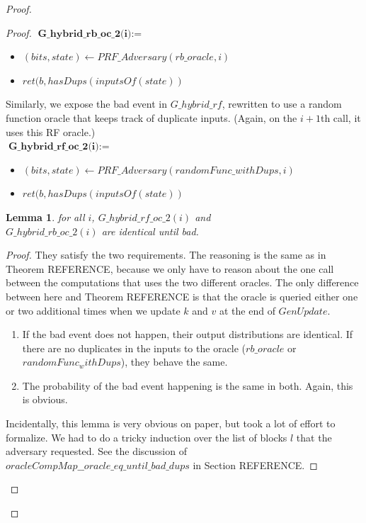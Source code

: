\documentclass[12pt,lot, lof]{puthesis}
\newenvironment{game}
{ \begin{itemize}[noitemsep,nolistsep] 
}
{ \end{itemize}                  }
\newcommand{\lar}{\leftarrow}
\newtheorem{lem}{Lemma}[thm]
\begin{document}
{\begin{proof}
\begin{proof}
$\textbf{G\_hybrid\_rb\_oc\_2(i)} := $
\begin{game}
\item[] $(bits, state) \lar PRF\_Adversary (rb\_oracle, i)$
\item[] $ret(b, hasDups(inputsOf(state))$ \\
\end{game}

Similarly, we expose the bad event in $G\_hybrid\_rf$, rewritten to use a random function oracle that keeps track of duplicate inputs. (Again, on the $i+1$th call, it uses this RF oracle.)\\

$\textbf{G\_hybrid\_rf\_oc\_2(i)} := $
\begin{game}
\item[] $(bits, state) \lar PRF\_Adversary (randomFunc\_withDups, i)$
\item[] $ret(b, hasDups(inputsOf(state))$ 
\end{game} 

\begin{lem} for all $i$,
$G\_hybrid\_rf\_oc\_2(i)$ and \\
  $G\_hybrid\_rb\_oc\_2(i)$ are identical until bad. \end{lem}
\begin{proof} 
They satisfy the two requirements. The reasoning is the same as in Theorem REFERENCE, because we only have to reason about the one call between the computations that uses the two different oracles. The only difference between here and Theorem REFERENCE is that the oracle is queried either one or two additional times when we update $k$ and $v$ at the end of $GenUpdate$.

  \begin{enumerate}
  \item If the bad event does not happen, their output distributions are identical. If there are no duplicates in the inputs to the oracle ($rb\_oracle$ or $randomFunc_withDups$), they behave the same.
  \item The probability of the bad event happening is the same in both. Again, this is obvious.
  \end{enumerate}

Incidentally, this lemma is very obvious on paper, but took a lot of effort to formalize. We had to do a tricky induction over the list of blocks $l$ that the adversary requested. See the discussion of $oracleCompMap\_\_oracle\_eq\_until\_bad\_dups$ in Section REFERENCE.
\end{proof}


\end{proof}
\end{proof}}
\end{document}
